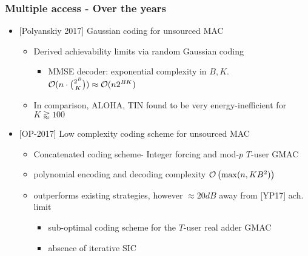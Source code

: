 \begin{frame} \frametitle{Multiple access - Over the years}
	\begin{itemize} 
	\item {[Polyanskiy 2017]} Gaussian coding for unsourced MAC 
	\vspace{3pt}
	\begin{itemize}	\setlength{\itemsep}{4pt}
		\item Derived achievability limits via random Gaussian coding 
			\begin{itemize}
				\item MMSE decoder: {\color{red} exponential complexity} in $B,K$. $\mathcal{O}(n\cdot\binom{2^B}{K})\approx\mathcal{O}(n2^{BK})$
			\end{itemize}
			\item In comparison, ALOHA, TIN found to be very energy-inefficient for $K\gtrapprox100$
	\end{itemize}
	\pause 
	\vspace{4ex}
	\item {[OP-2017]} Low complexity coding scheme for unsourced MAC
	\begin{itemize}\setlength{\itemsep}{4pt}
		\item Concatenated coding scheme- Integer forcing and mod-$p$ $T$-user GMAC
		\item {\color{blue} polynomial} encoding and decoding complexity $\mathcal{O}\left(\max(n, KB^2)\right)$
		\item outperforms existing strategies, however $\approx 20dB$ away from [YP17] ach. limit
		\begin{itemize}
		\item sub-optimal coding scheme for the $T$-user real adder GMAC
		\item absence of iterative SIC		
		\end{itemize}
	\end{itemize}
\end{itemize}
\end{frame}

